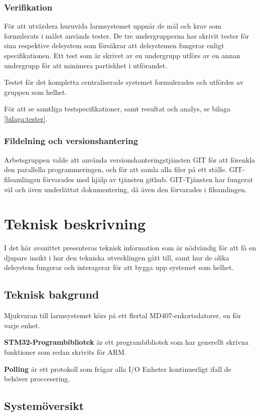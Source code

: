 \documentclass{article}
\begin{document}
\subsubsection{Verifikation}
\label{verifikation}
För att utvärdera huruvida larmsystemet uppnår de mål och krav som formulerats i målet används tester.
De tre undergrupperna har skrivit tester för sina respektive delsystem som försäkrar att
delsystemen fungerar enligt specifikationen. Ett test som är skrivet av en undergrupp utförs
av en annan undergrupp för att minimera partiskhet i utförandet.

Testet för det kompletta centraliserade systemet formulerades och utfördes av gruppen som helhet.

För att se samtliga testspecifikationer, samt resultat och analys, se bilaga \ref{bilaga:tester}.

\subsubsection{Fildelning och versionshantering}
Arbetsgruppen valde att använda versionshanteringstjänsten GIT för att förenkla den parallella programmeringen, och för att samla alla filer på ett ställe. GIT-filsamlingen förvarades med hjälp av tjänsten github. GIT-Tjänsten har fungerat väl och även underlättat dokumentering, då även den förvarades i filsamlingen.

\newpage
\section{Teknisk beskrivning} %
I det här avsnittet presenteras teknisk information som är nödvändig för att få en djupare insikt i hur den tekniska utvecklingen gått till, samt hur de olika delsystem fungerar och interagerar för att bygga upp systemet som helhet.
\subsection{Teknisk bakgrund}
Mjukvaran till larmsystemet körs på ett flertal MD407-enkortsdatorer, en för varje enhet.

\textbf{STM32-Programbibliotek}\cite{stm} är ett programbibliotek som har generellt skrivna funktioner som 
redan skrivits för ARM.

\textbf{Polling} är ett protokoll som frågar alla I/O Enheter kontinuerligt ifall de behöver proccesering.\subsection{Systemöversikt}
\end{document}
